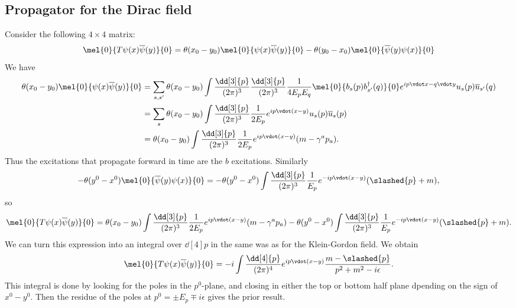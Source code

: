 \documentclass{jknotes} %
\begin{document}
\subsection{Propagator for the Dirac field}
Consider the following \(4\times4\) matrix:
\begin{equation}
    \mel{0}{T\psi(x)\overline{\psi}(y)}{0} = \theta(x_0-y_0)\mel{0}{\psi(x)\overline{\psi}(y)}{0} - \theta(y_0-x_0)\mel{0}{\overline{\psi}(y)\psi(x)}{0}
\end{equation}
We have
{\hfuzz=4pt \begin{align}
    \theta(x_0-y_0)\mel{0}{\psi(x)\overline{\psi}(y)}{0} 
    &= \sum_{s,s'} \theta(x_0-y_0)\int\frac{\dd[3]{p}}{(2\pi)^3}\frac{\dd[3]{p}}{(2\pi)^3}\frac{1}{4E_pE_q}\mel{0}{b_s(p)b_{s'}^\dagger(q)}{0}e^{ip\vdot x-q\vdot y}u_s(p)\overline{u}_{s'}(q) \\
    &= \sum_s \theta(x_0-y_0) \int \frac{\dd[3]{p}}{(2\pi)^3}\frac{1}{2E_p}e^{ip\vdot(x-y)}u_s(p)\overline{u}_s(p) \\
    &= \theta(x_0-y_0)\int\frac{\dd[3]{p}}{(2\pi)^3}\frac{1}{2E_p}e^{ip\vdot(x-y)}(m-\gamma^ap_a).
\end{align}}
Thus the excitations that propagate forward in time are the \(b\) excitations. Similarly
\begin{equation}
    -\theta(y^0-x^0)\mel{0}{\overline{\psi}(y)\psi(x)}{0} = -\theta(y^0-x^0)\int\frac{\dd[3]{p}}{(2\pi)^3}\frac{1}{E_p}e^{-ip\vdot(x-y)}(\slashed{p} + m),
\end{equation}
so
\begin{equation}
    \mel{0}{T\psi(x)\overline{\psi}(y)}{0} = \theta(x_0-y_0)\int\frac{\dd[3]{p}}{(2\pi)^3}\frac{1}{2E_p}e^{ip\vdot(x-y)}(m-\gamma^ap_a) -\theta(y^0-x^0)\int\frac{\dd[3]{p}}{(2\pi)^3}\frac{1}{E_p}e^{-ip\vdot(x-y)}(\slashed{p} + m).
\end{equation}
We can turn this expression into an integral over \(\dd[4]{p}\) in the same was as for the Klein-Gordon field. We obtain
\begin{equation}
    \mel{0}{T\psi(x)\overline{\psi}(y)}{0} = -i\int\frac{\dd[4]{p}}{(2\pi)^4}e^{ip\vdot(x-y)}\frac{m-\slashed{p}}{p^2+m^2-i\epsilon}.
\end{equation}
This integral is done by looking for the poles in the \(p^0\)-plane, and closing in either the top or bottom half plane dpending on the sign of \(x^0-y^0\). Then the residue of the poles at \(p^0 = \pm E_p\mp i\epsilon\) gives the prior result.
\end{document}
